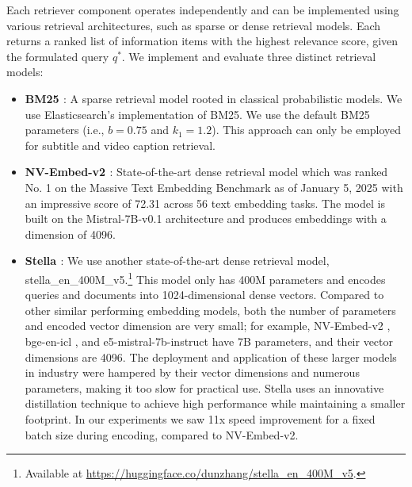 Each retriever component operates independently and can be implemented using various retrieval architectures, such as sparse or dense retrieval models. Each returns a ranked list of information items with the highest relevance score, given the formulated query $q^*$. We implement and evaluate three distinct retrieval models:
\begin{itemize}[leftmargin=*]
    \item \textbf{BM25 \cite{robertson1994some}}: A sparse retrieval model rooted in classical probabilistic models. We use Elasticsearch's implementation of BM25. We use the default BM25 parameters (i.e., $b=0.75$ and $k_1=1.2$). This approach can only be employed for subtitle and video caption retrieval.

     \item \textbf{NV-Embed-v2 \cite{lee2024nv}}: State-of-the-art dense retrieval model which was ranked No. 1 on the Massive Text Embedding Benchmark \cite{muennighoff-etal-2023-mteb} as of January 5, 2025 with an impressive score of 72.31 across 56 text embedding tasks. The model is built on the Mistral-7B-v0.1 architecture and produces embeddings with a dimension of 4096. 
    
    \item \textbf{Stella \cite{zhang2024jasper}}: We use another state-of-the-art dense retrieval model, stella\_en\_400M\_v5.\footnote{Available at \url{https://huggingface.co/dunzhang/stella_en_400M_v5}.} This model only has 400M parameters and encodes queries and documents into 1024-dimensional dense vectors. Compared to other similar performing embedding models, both the number of parameters and encoded vector dimension are very small; for example, NV-Embed-v2 \cite{lee2024nv}, bge-en-icl \cite{li2024making}, and e5-mistral-7b-instruct \cite{wang2022text, wang2023improving, wang2024multilingual} have 7B parameters, and their vector dimensions are 4096. The deployment and application of these larger models in industry were hampered by their vector dimensions and numerous parameters, making it too slow for practical use. Stella uses an innovative distillation technique to achieve high performance while maintaining a smaller footprint. In our experiments we saw 11x speed improvement for a fixed batch size during encoding, compared to NV-Embed-v2.


\end{itemize}
